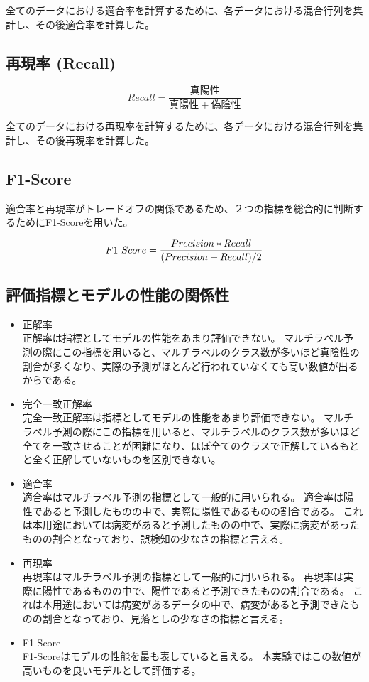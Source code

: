 全てのデータにおける適合率を計算するために、各データにおける混合行列を集計し、その後適合率を計算した。
\subsection{再現率 (Recall)}
\begin{equation}
Recall = \frac{真陽性}{真陽性+偽陰性}
\end{equation}

全てのデータにおける再現率を計算するために、各データにおける混合行列を集計し、その後再現率を計算した。
\subsection{F1-Score}
適合率と再現率がトレードオフの関係であるため、２つの指標を総合的に判断するためにF1-Scoreを用いた。

\begin{equation}
F1{\rm \mathchar"712D}Score = \frac{Precision * Recall}{(Precision + Recall) / 2}
\end{equation}

\subsection{評価指標とモデルの性能の関係性}
\begin{itemize}
    \item 正解率\\
        正解率は指標としてモデルの性能をあまり評価できない。
        マルチラベル予測の際にこの指標を用いると、マルチラベルのクラス数が多いほど真陰性の割合が多くなり、実際の予測がほとんど行われていなくても高い数値が出るからである。
    \item 完全一致正解率\\
        完全一致正解率は指標としてモデルの性能をあまり評価できない。
        マルチラベル予測の際にこの指標を用いると、マルチラベルのクラス数が多いほど全てを一致させることが困難になり、ほぼ全てのクラスで正解しているもとと全く正解していないものを区別できない。
    \item 適合率\\
        適合率はマルチラベル予測の指標として一般的に用いられる。
        適合率は陽性であると予測したものの中で、実際に陽性であるものの割合である。
        これは本用途においては病変があると予測したものの中で、実際に病変があったものの割合となっており、誤検知の少なさの指標と言える。
    \item 再現率\\
        再現率はマルチラベル予測の指標として一般的に用いられる。
        再現率は実際に陽性であるものの中で、陽性であると予測できたものの割合である。
        これは本用途においては病変があるデータの中で、病変があると予測できたものの割合となっており、見落としの少なさの指標と言える。
    \item F1-Score\\
        F1-Scoreはモデルの性能を最も表していると言える。
        本実験ではこの数値が高いものを良いモデルとして評価する。
\end{itemize}

